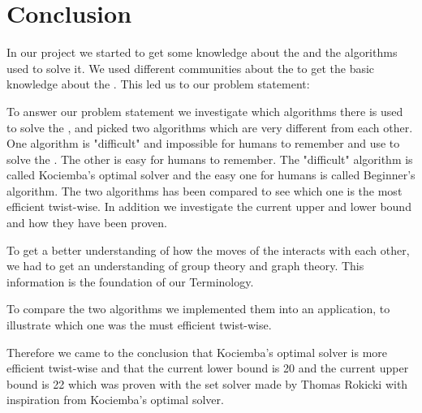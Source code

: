 \chapter{Conclusion}
In our project we started to get some knowledge about the \rubik{} and the algorithms used to solve it. We used different communities about the \rubik{} to get the basic knowledge about the \rubik{}. This led us to our problem statement:
%


\linebreak

To answer our problem statement we investigate which algorithms there is used to solve the \rubik{}, and picked two algorithms which are very different from each other. 
One algorithm is "difficult" and impossible for humans to remember and use to solve the \rubik{}. 
The other is easy for humans to remember. 
The "difficult" algorithm is called Kociemba's optimal solver and the easy one for humans is called Beginner's algorithm. 
The two algorithms has been compared to see which one is the most efficient twist-wise. 
In addition we investigate the current upper and lower bound and how they have been proven.

To get a better understanding of how the moves of the \rubik{} interacts with each other, we had to get an understanding of group theory and graph theory. This information is the foundation of our Terminology.

To compare the two algorithms we implemented them into an application, to illustrate which one was the must efficient twist-wise. 

Therefore we came to the conclusion that Kociemba's optimal solver is more efficient twist-wise and that the current lower bound is 20 and the current upper bound is 22 which was proven with the set solver made by Thomas Rokicki with inspiration from Kociemba's optimal solver.

